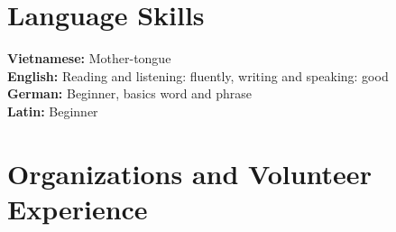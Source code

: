 \documentclass[letterpaper,11pt]{article}
\newcommand{\resumeSubHeadingListStart}{\begin{itemize}[leftmargin=0.15in, label={}]}
\newcommand{\resumeSubHeadingListEnd}{\end{itemize}}
\begin{document}
\section{Language Skills}
\vspace{2pt}
\resumeSubHeadingListStart
\small{\item{
		\textbf{Vietnamese:}{ Mother-tongue} \\ \vspace{3pt}
		\textbf{English:}{ Reading and listening: fluently, writing and speaking: good}\\ \vspace{3pt}
		\textbf{German:}{ Beginner, basics word and phrase} \\ \vspace{3pt}
		\textbf{Latin:}{ Beginner}
		
		
}}
\resumeSubHeadingListEnd
	 \section{Organizations and Volunteer Experience}
\end{document}
